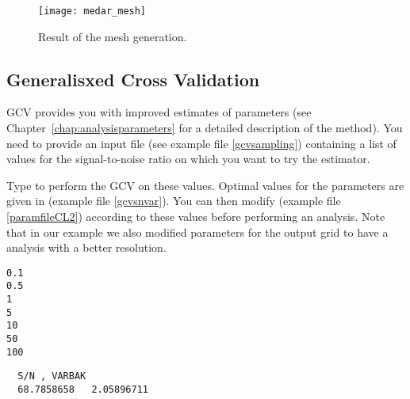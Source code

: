 \begin{figure}[htpb]
\centering
\parbox{.65\textwidth}{
\texttt{[image: medar\_mesh]}
}\parbox{.35\textwidth}{
\caption{Result of the mesh generation.\label{divameshCL2}}
}
\end{figure}


\subsection{Generalisxed Cross Validation}

GCV provides you with improved estimates of parameters (see Chapter~\ref{chap:analysisparameters} for a detailed description of the method). You need to provide an input file  (see example file \ref{gcvsampling}) containing a list of values for the signal-to-noise ratio on which you want to try the estimator.

Type  to perform the GCV on these values. Optimal values for the parameters are given in  (example file \ref{gcvsnvar}). You can then modify  (example file \ref{paramfileCL2}) according to these values before performing an analysis. Note that in our example we also modified parameters for the output grid to have a analysis with a better resolution.


\begin{exfile}[H]
\begin{footnotesize}
\begin{verbatim}
0.1
0.5
1
5
10
50
100
\end{verbatim}
\end{footnotesize}
\caption{. \label{gcvsampling}}
\end{exfile}


\begin{exfile}[H]
\begin{footnotesize}
\begin{verbatim}
  S/N , VARBAK
  68.7858658   2.05896711
\end{verbatim}
\end{footnotesize}
\caption{. \label{gcvsnvar}}
\end{exfile}



